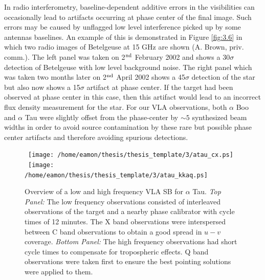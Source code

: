 In radio interferometry, baseline-dependent additive errors in the visibilities can occasionally lead to artifacts occurring at phase center of the final image. Such errors may be caused by unflagged low level interference picked up by some antennas baselines. An example of this is demonstrated in Figure \ref{fig:3.6} in which two radio images of Betelgeuse at 15 GHz are shown (A. Brown, priv. comm.). The left panel was taken on 2$^{\rm{nd}}$ February 2002 and shows a 30$\sigma$ detection of Betelgeuse with low level background noise. The right panel which was taken two months later on 2$^{\rm{nd}}$ April 2002 shows a 45$\sigma$ detection of the star but also now shows a 15$\sigma$ artifact at phase center. If the target had been observed at phase center in this case, then this artifact would lead to an incorrect flux density measurement for the star. For our VLA observations, both $\alpha$ Boo and $\alpha$ Tau were slightly offset from the phase-center by $\sim 5$ synthesized beam widths in order to avoid source contamination by these rare but possible phase center artifacts and therefore avoiding spurious detections. 

\begin{figure}[hbt!]
\centering 
\mbox{
          \texttt{[image: /home/eamon/thesis/thesis\_template/3/atau\_cx.ps]}}
\mbox{
          \texttt{[image: /home/eamon/thesis/thesis\_template/3/atau\_kkaq.ps]}
          }
\caption[Overview of a low and high frequency VLA observation.]{Overview of a low and high frequency VLA SB for $\alpha$ Tau. \textit{Top Panel:} The low frequency observations consisted of interleaved
observations of the target and a nearby phase calibrator with cycle times of 12 minutes. The X band observations were interspersed between C band observations to obtain a good spread in $u-v$ coverage. \textit{Bottom Panel:} The high frequency observations had short cycle times to compensate for tropospheric effects. Q band observations were taken first to ensure the best pointing solutions were applied to them. }
\label{fig:3.7}
\end{figure}

